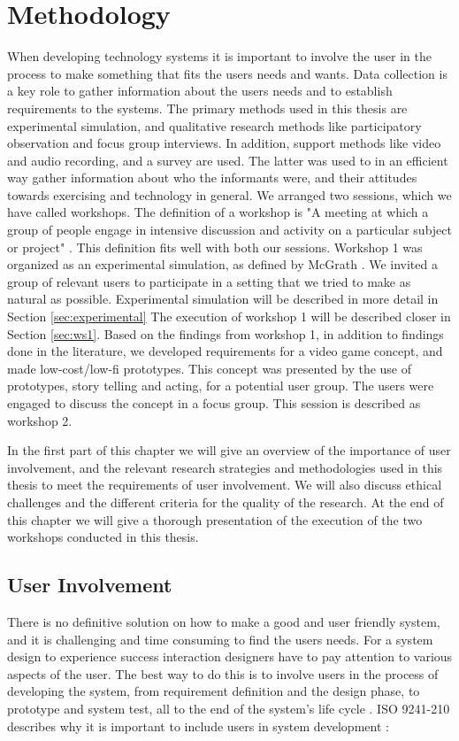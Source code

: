 \chapter{Methodology}
When developing technology systems it is important to involve the user in the process to make something that fits the users needs and wants. Data collection is a key role to gather information about the users needs and to establish requirements to the systems. The primary methods used in this thesis are experimental simulation, and qualitative research methods like participatory observation and focus group interviews. In addition, support methods like video and audio recording, and a survey are used. The latter was used to in an efficient way gather information about  who the informants were, and their attitudes towards exercising and technology in general. We arranged two sessions, which we have called workshops.  The definition of a workshop is "A meeting at which a group of people engage in intensive discussion and activity on a particular subject or project" \cite{dictionary}. This definition fits well with both our sessions. Workshop 1 was organized as an experimental simulation, as defined by McGrath \cite{McGrath}. We invited a group of relevant users to participate in a setting that we tried to make as natural as possible. Experimental simulation will be described in more detail in Section \ref{sec:experimental} The execution of workshop 1 will be described closer in Section \ref{sec:ws1}. Based on the findings from workshop 1, in addition to findings done in the literature, we developed requirements for a video game concept, and made low-cost/low-fi prototypes. This concept was presented by the use of prototypes, story telling and acting, for a potential user group. The users were engaged to discuss the concept in a focus group. This session is described as workshop 2.

In the first part of this chapter we will give an overview of the importance of user involvement, and the relevant research strategies and methodologies used in this thesis to meet the requirements of user involvement. We will also discuss ethical challenges and the different criteria for the quality of the research. At the end of this chapter we will give a thorough presentation of the execution of the two workshops conducted in this thesis. 

\section{User Involvement}
There is no definitive solution on how to make a good and user friendly system, and it is challenging and time consuming to find the users needs. For a system design to experience success interaction designers have to pay attention to various aspects of the user. The best way to do this is to involve users in the process of developing the system, from requirement definition and the design phase, to prototype and system test, all to the end of the system's life cycle \cite{mmi}. ISO 9241-210 describes why it is important to include users in system development \cite{dis20109241}:

